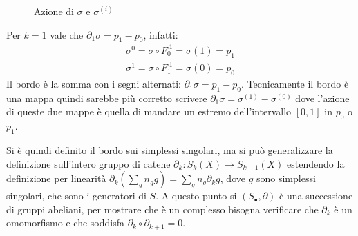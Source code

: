 \begin{figure}[htbp]
  \centering
  \caption{Azione di $ \sigma $ e $ \sigma^{(i)} $}
  \label{fig:lez1:sigma}
\end{figure}

\begin{example}[$ k = 1 $]
  Per $ k = 1 $ vale che $ \partial_1 \sigma = p_1 - p_0 $, infatti:
  \begin{align*}
    \sigma^{0} = \sigma \circ F_0^{\; 1} = \sigma(1) = p_1 \\
    \sigma^{1} = \sigma \circ F_1^{\; 1} = \sigma(0) = p_0
  \end{align*}
  Il bordo è la somma con i segni alternati: $ \partial_1 \sigma = p_1 - p_0 $. Tecnicamente
  il bordo è una mappa quindi sarebbe più corretto scrivere
  $ \partial_1 \sigma = \sigma^{(1)} - \sigma^{(0)} $ dove l'azione di queste due mappe è quella di
  mandare un estremo dell'intervallo $ [0,1] $ in $ p_0 $ o $ p_1 $.
\end{example}

Si è quindi definito il bordo sui simplessi singolari, ma si può generalizzare
la definizione sull'intero gruppo di catene
$ \partial_k: S_k(X) \to S_{k-1}(X) $ estendendo la definizione per linearità
$ \partial_k \left( \sum_g n_g g\right) = \sum_g n_g \partial_k g $, dove $ g $ sono simplessi
singolari, che sono i generatori di $ S $. A questo punto si
$ (S_\bullet, \partial) $ è una successione di gruppi abeliani, per mostrare che è un
complesso bisogna verificare che $ \partial_k $ è un omomorfismo e che
soddisfa $ \partial_k \circ \partial_{k+1} = 0 $.

